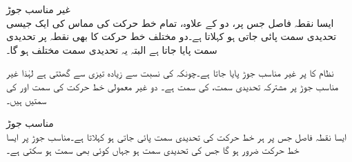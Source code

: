 \quad غیر مناسب جوڑ\\
ایسا نقطہ فاصل  جس پر، دو  کے علاوہ، تمام خط حرکت کی مماس کی ایک جیسی تحدیدی سمت پائی جاتی ہو  کہلاتا ہے۔دو مختلف خط حرکت کا بھی نقطہ  پر تحدیدی سمت پایا جاتا ہے البتہ یہ تحدیدی سمت مختلف ہو گا۔

نظام  کا  پر غیر مناسب جوڑ پایا جاتا ہے۔چونکہ  کی نسبت سے  زیادہ تیزی سے گھٹتی ہے لہٰذا  غیر مناسب جوڑ پر مشترکہ تحدیدی سمت،   کی سمت ہے۔ دو غیر معمولی خط حرکت کی
 سمت  اور  کی سمتیں ہیں۔

\quad مناسب جوڑ\\
ایسا نقطہ فاصل  جس پر ہر خط حرکت کی  تحدیدی سمت پائی جاتی ہو  کہلاتا ہے۔مناسب جوڑ پر ایسا خط حرکت ضرور ہو گا جس کی تحدیدی سمت  ہو جہاں  کوئی بھی سمت ہو سکتی ہے۔

